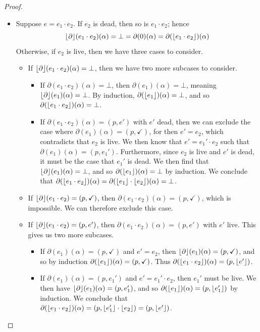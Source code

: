 \documentclass[orivec,envcountsect,envcountsame]{llncs}
\begin{document}
\begin{proof}
\begin{itemize}
		\item
		Suppose $e = e_1 \cdot e_2$.
		If $e_2$ is dead, then so is $e_1 \cdot e_2$; hence
		\[
		\lfloor\partial\rfloor(e_1 \cdot e_2)(\alpha)
		= \bot
		= \partial(0)(\alpha)
		= \partial(\lfloor e_1 \cdot e_2\rfloor)(\alpha)
		\]
		Otherwise, if $e_2$ is live, then we have three cases to consider.
		\begin{itemize}
			\item
			If $\lfloor\partial\rfloor(e_1 \cdot e_2)(\alpha) = \bot$, then we have two more subcases to consider.
			\begin{itemize}
				\item
				If $\partial(e_1 \cdot e_2)(\alpha) = \bot$, then $\partial(e_1)(\alpha) = \bot$, meaning $\lfloor\partial\rfloor(e_1)(\alpha) = \bot$.
				By induction, $\partial(\lfloor e_1\rfloor)(\alpha) = \bot$, and so $\partial(\lfloor e_1 \cdot e_2\rfloor)(\alpha) = \bot$.
				\item
				If $\partial(e_1 \cdot e_2)(\alpha) = (p, e')$ with $e'$ dead, then we can exclude the case where $\partial(e_1)(\alpha) = (p, \checkmark)$, for then $e' = e_2$, which contradicts that $e_2$ is live.
				We then know that $e' = e_1' \cdot e_2$ such that $\partial(e_1)(\alpha) = (p, e_1')$.
				Furthermore, since $e_2$ is live and $e'$ is dead, it must be the case that $e_1'$ is dead.
				We then find that $\lfloor\partial\rfloor(e_1)(\alpha) = \bot$, and so $\partial(\lfloor e_1\rfloor)(\alpha) = \bot$ by induction.
				We conclude that $\partial(\lfloor e_1 \cdot e_2\rfloor)(\alpha) = \partial(\lfloor e_1\rfloor \cdot \lfloor e_2\rfloor)(\alpha) = \bot$.
			\end{itemize}

			\item
			If $\lfloor\partial\rfloor(e_1 \cdot e_2) = (p, \checkmark)$, then $\partial(e_1 \cdot e_2)(\alpha) = (p, \checkmark)$, which is impossible.
			We can therefore exclude this case.

			\item
			If $\lfloor\partial\rfloor(e_1 \cdot e_2) = (p, e')$, then $\partial(e_1 \cdot e_2)(\alpha) = (p, e')$ with $e'$ live.
			This gives us two more subcases.
			\begin{itemize}
				\item
				If $\partial(e_1)(\alpha) = (p, \checkmark)$ and $e' = e_2$, then $\lfloor\partial\rfloor(e_1)(\alpha) = (p, \checkmark)$, and so by induction $\partial(\lfloor e_1\rfloor)(\alpha) = (p, \checkmark)$.
				Thus $\partial(\lfloor e_1 \cdot e_2\rfloor)(\alpha) = (p, \lfloor e'\rfloor)$.

				\item
				If $\partial(e_1)(\alpha) = (p, e_1')$ and $e' = e_1' \cdot e_2$, then $e_1'$ must be live.
				We then have $\lfloor\partial\rfloor(e_1)(\alpha) = (p, e_1')$, and so $\partial(\lfloor e_1\rfloor)(\alpha) = (p, \lfloor e_1'\rfloor)$ by induction.
				We conclude that $\partial(\lfloor e_1 \cdot e_2\rfloor)(\alpha) = (p, \lfloor e_1'\rfloor \cdot \lfloor e_2\rfloor) = (p, \lfloor e'\rfloor)$.
			\end{itemize}
		\end{itemize}


\end{itemize}
\end{proof}
\end{document}

